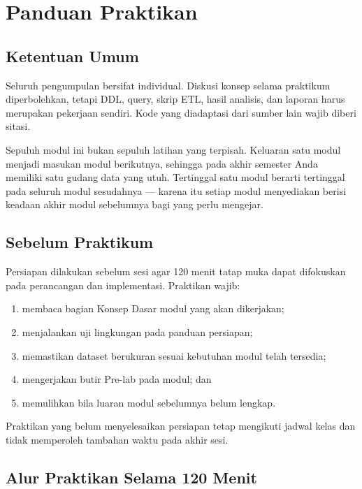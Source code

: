 \chapter{Panduan Praktikan}

\section{Ketentuan Umum}

Seluruh pengumpulan bersifat individual. Diskusi konsep selama praktikum
diperbolehkan, tetapi DDL, query, skrip ETL, hasil analisis, dan laporan harus
merupakan pekerjaan sendiri. Kode yang diadaptasi dari sumber lain wajib diberi
sitasi.

Sepuluh modul ini bukan sepuluh latihan yang terpisah. Keluaran satu modul
menjadi masukan modul berikutnya, sehingga pada akhir semester Anda memiliki
satu gudang data yang utuh. Tertinggal satu modul berarti tertinggal pada
seluruh modul sesudahnya --- karena itu setiap modul menyediakan
 berisi keadaan akhir modul sebelumnya bagi yang perlu
mengejar.

\section{Sebelum Praktikum}

Persiapan dilakukan sebelum sesi agar 120 menit tatap muka dapat difokuskan
pada perancangan dan implementasi. Praktikan wajib:

\begin{enumerate}[leftmargin=1.4em]
  \item membaca bagian Konsep Dasar modul yang akan dikerjakan;
  \item menjalankan uji lingkungan pada panduan persiapan;
  \item memastikan dataset berukuran sesuai kebutuhan modul telah tersedia;
  \item mengerjakan butir Pre-lab pada modul; dan
  \item memulihkan  bila luaran modul sebelumnya belum
        lengkap.
\end{enumerate}

Praktikan yang belum menyelesaikan persiapan tetap mengikuti jadwal kelas dan
tidak memperoleh tambahan waktu pada akhir sesi.

\section{Alur Praktikan Selama 120 Menit}

